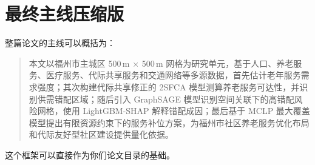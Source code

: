 \section*{最终主线压缩版}

整篇论文的主线可以概括为：

\begin{quote}
本文以福州市主城区 500\,m $\times$ 500\,m 网格为研究单元，基于人口、养老服务、医疗服务、代际共享服务和交通网络等多源数据，首先估计老年服务需求强度；其次构建代际共享修正的 2SFCA 模型测算养老服务可达性，并识别供需错配区域；随后引入 GraphSAGE 模型识别空间关联下的高错配风险网格，使用 LightGBM-SHAP 解释错配成因；最后基于 MCLP 最大覆盖模型提出有限资源约束下的服务补位方案，为福州市社区养老服务优化布局和代际友好型社区建设提供量化依据。
\end{quote}

这个框架可以直接作为你们论文目录的基础。
